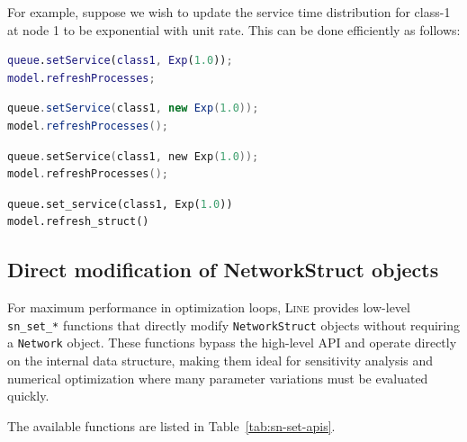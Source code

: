 For example, suppose we wish to update the service time distribution for class-1 at node 1 to be exponential with unit rate. This can be done efficiently as follows:
\begin{MATLAB}
\begin{lstlisting}[language = matlab]
queue.setService(class1, Exp(1.0));
model.refreshProcesses;
\end{lstlisting}
\end{MATLAB}
\begin{JAVA}
\begin{lstlisting}[language=java, basicstyle=\ttfamily\scriptsize]
queue.setService(class1, new Exp(1.0));
model.refreshProcesses();
\end{lstlisting}
\end{JAVA}
\begin{KOTLIN}
\begin{lstlisting}[language=kotlin, basicstyle=\ttfamily\scriptsize]
queue.setService(class1, new Exp(1.0));
model.refreshProcesses();
\end{lstlisting}
\end{KOTLIN}
\begin{PYTHON}
\begin{lstlisting}[language=python]
queue.set_service(class1, Exp(1.0))
model.refresh_struct()
\end{lstlisting}
\end{PYTHON}

\subsection{Direct modification of NetworkStruct objects}
\label{direct-modification-networkstruct}
For maximum performance in optimization loops, \textsc{Line} provides low-level \texttt{sn\_set\_*} functions that directly modify \texttt{NetworkStruct} objects without requiring a \texttt{Network} object. These functions bypass the high-level API and operate directly on the internal data structure, making them ideal for sensitivity analysis and numerical optimization where many parameter variations must be evaluated quickly.

The available functions are listed in Table~\ref{tab:sn-set-apis}.

